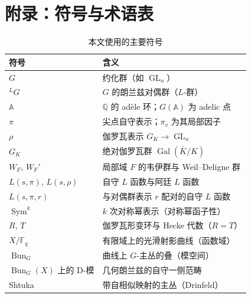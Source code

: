 \section{附录：符号与术语表}\label{sec:appendix}

\begin{table}[htbp]
    \centering
    \caption{本文使用的主要符号}
    \label{tab:notation}
    \begin{tabular}{ll}
        \toprule
        符号 & 含义 \\
        \midrule
        $G$ & 约化群（如 $\operatorname{GL}_n$） \\
        $^LG$ & $G$ 的朗兰兹对偶群（$L$-群） \\
        $\mathbb{A}$ & $\mathbb{Q}$ 的 adèle 环；$G(\mathbb{A})$ 为 adelic 点 \\
        $\pi$ & 尖点自守表示；$\pi_v$ 为其局部因子 \\
        $\rho$ & 伽罗瓦表示 $G_K \to \operatorname{GL}_n$ \\
        $G_K$ & 绝对伽罗瓦群 $\operatorname{Gal}(\overline{K}/K)$ \\
        $W_F$, $W_F'$ & 局部域 $F$ 的韦伊群与 Weil--Deligne 群 \\
        $L(s,\pi)$, $L(s,\rho)$ & 自守 $L$ 函数与阿廷 $L$ 函数 \\
        $L(s,\pi,r)$ & 与对偶群表示 $r$ 配对的自守 $L$ 函数 \\
        $\operatorname{Sym}^k$ & $k$ 次对称幂表示（对称幂函子性） \\
        $R$, $T$ & 伽罗瓦形变环与 Hecke 代数（$R=T$） \\
        $X/\mathbb{F}_q$ & 有限域上的光滑射影曲线（函数域） \\
        $\operatorname{Bun}_G$ & 曲线上 $G$-主丛的叠（模空间） \\
        $\operatorname{Bun}_{G}(X)$ 上的 D-模 & 几何朗兰兹的自守一侧范畴 \\
        Shtuka & 带自相似映射的主丛（Drinfeld） \\
        \bottomrule
    \end{tabular}
\end{table}

